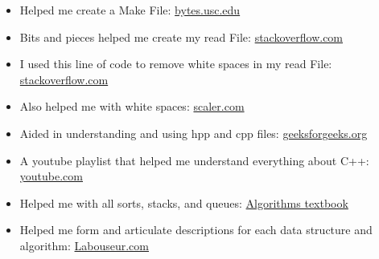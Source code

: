 \documentclass[letterpaper, 10pt,DIV=13]{scrartcl}
\numberwithin{equation}{section} %
\numberwithin{figure}{section} %
\numberwithin{table}{section} %
\begin{document}
\begin{itemize}
    \item Helped me create a Make File: \href{https://bytes.usc.edu/cs104/wiki/makefile/}{bytes.usc.edu}

    \item Bits and pieces helped me create my read File: \href{https://stackoverflow.com/questions/47426692/read-data-from-a-file-into-an-array-c}{stackoverflow.com}
    
    \item I used this line of code to remove white spaces in my read File: \href{https://stackoverflow.com/questions/83439/remove-spaces-from-stdstring-in-c}{stackoverflow.com}
    
    \item Also helped me with white spaces: \href{https://www.scaler.com/topics/removing-whitespace-from-a-string-in-cpp/}{scaler.com}

    \item Aided in understanding and using hpp and cpp files: \href{https://www.geeksforgeeks.org/header-files-in-c-cpp-and-its-uses/#}{geeksforgeeks.org}

    \item A youtube playlist that helped me understand everything about C++: \href{https://youtube.com/playlist?list=PLlrATfBNZ98dudnM48yfGUldqGD0S4FFb&si=pGnvTmD_flPDjmx_}{youtube.com}

    \item Helped me with all sorts, stacks, and queues: \href{http://jeffe.cs.illinois.edu/teaching/algorithms/book/Algorithms-JeffE.pdf}{Algorithms textbook}

    \item Helped me form and articulate descriptions for each data structure and algorithm: \href{https://www.labouseur.com/courses/algorithms/}{Labouseur.com}
    
    
\end{itemize}

\pagebreak

% 
\end{document}
